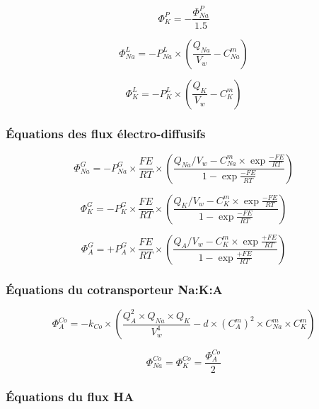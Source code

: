 \documentclass[a4paper,fleqn]{article}
\begin{document}
\begin{equation}
\Phi_{K}^{P}=-\frac{\Phi_{Na}^{P}}{1.5}
\end{equation}

\begin{equation}
\Phi_{Na}^{L}={-P_{Na}^{L}}\times{\left(\frac{Q_{Na}}{V_w}-C_{Na}^{m}\right)}
\end{equation}

\begin{equation}
\Phi_{K}^{L}={-P_{K}^{L}}\times{\left(\frac{Q_{K}}{V_w}-C_{K}^{m}\right)}
\end{equation}

\subsubsection*{Équations des flux électro-diffusifs}

\begin{equation}
\Phi_{Na}^{G}={-P_{Na}^{G}}\times{\frac{FE}{RT}}\times{\left(\frac{Q_{Na}/V_w-{C_{Na}^{m}}\times{\exp{\frac{-FE}{RT}}}}{1 - \exp{\frac{-FE}{RT}}}\right)}
\end{equation}

\begin{equation}
\Phi_{K}^{G}={-P_{K}^{G}}\times{\frac{FE}{RT}}\times{\left(\frac{Q_{K}/V_w-{C_{K}^{m}}\times{\exp{\frac{-FE}{RT}}}}{1 - \exp{\frac{-FE}{RT}}}\right)}
\end{equation}

\begin{equation}
\Phi_{A}^{G}={+P_{A}^{G}}\times{\frac{FE}{RT}}\times{\left(\frac{Q_{A}/V_w-{C_{K}^{m}}\times{\exp{\frac{+FE}{RT}}}}{1 - \exp{\frac{+FE}{RT}}}\right)}
\end{equation}

\subsubsection*{Équations du cotransporteur Na:K:A}

\begin{equation}
\Phi_{A}^{Co}={-k_{Co}}\times{\left(\frac{{Q_{A}^2}\times{Q_{Na}}\times{Q_{K}}}{V_w^4}-{d}\times{\left(C_{A}^{m}\right)^2}\times{C_{Na}^{m}}\times{C_{K}^{m}}\right)}
\end{equation}

\begin{equation}
\Phi_{Na}^{Co}=\Phi_{K}^{Co}=\frac{\Phi_{A}^{Co}}{2}
\end{equation}

\subsubsection*{Équations du flux HA}
\end{document}
